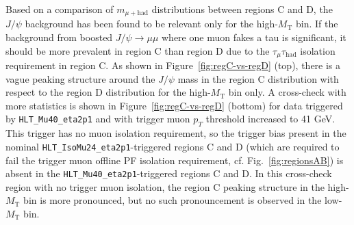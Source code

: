 Based on a comparison of $m_{\mu+\text{had}}$ distributions between regions C and D, the $J\slash\psi$ background has been found to be relevant only for the high-$M_{\text{T}}$ bin.  If the background from boosted $J\slash\psi\rightarrow\mu\mu$ where one muon fakes a tau is significant, it should be more prevalent in region C than region D due to the $\tau_{\mu}\tau_{\text{had}}$ isolation requirement in region C.  As shown in Figure~\ref{fig:regC-vs-regD} (top), there is a vague peaking structure around the $J\slash\psi$ mass in the region C distribution with respect to the region D distribution for the high-$M_{\text{T}}$ bin only.  A cross-check with more statistics is shown in Figure~\ref{fig:regC-vs-regD} (bottom) for data triggered by \texttt{HLT\_Mu40\_eta2p1} and with trigger muon $p_T$ threshold increased to 41 GeV.  This trigger has no muon isolation requirement, so the trigger bias present in the nominal \texttt{HLT\_IsoMu24\_eta2p1}-triggered regions C and D (which are required to fail the trigger muon offline PF isolation requirement, cf. Fig.~\ref{fig:regionsAB}) is absent in the \texttt{HLT\_Mu40\_eta2p1}-triggered regions C and D.  In this cross-check region with no trigger muon isolation, the region C peaking structure in the high-$M_{\text{T}}$ bin is more pronounced, but no such pronouncement is observed in the low-$M_{\text{T}}$ bin.

